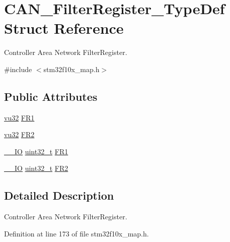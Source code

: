\hypertarget{struct_c_a_n___filter_register___type_def}{}\section{C\+A\+N\+\_\+\+Filter\+Register\+\_\+\+Type\+Def Struct Reference}
\label{struct_c_a_n___filter_register___type_def}


Controller Area Network Filter\+Register.  




{\ttfamily \#include $<$stm32f10x\+\_\+map.\+h$>$}

\subsection*{Public Attributes}
\begin{DoxyCompactItemize}
\item 
\hyperlink{agilefox_2library_2inc_2stm32f10x__type_8h_a6e2761f0a1011f84ed96b946f2c8a563}{vu32} \hyperlink{struct_c_a_n___filter_register___type_def_a3d54787d8329760446586ad21da29667}{F\+R1}
\item 
\hyperlink{agilefox_2library_2inc_2stm32f10x__type_8h_a6e2761f0a1011f84ed96b946f2c8a563}{vu32} \hyperlink{struct_c_a_n___filter_register___type_def_a028ebea46be9809d8e350efcb4a686bc}{F\+R2}
\item 
\hyperlink{group___c_m_s_i_s___c_m3__core__definitions_gaec43007d9998a0a0e01faede4133d6be}{\+\_\+\+\_\+\+IO} \hyperlink{_p_e___types_8h_a33594304e786b158f3fb30289278f5af}{uint32\+\_\+t} \hyperlink{struct_c_a_n___filter_register___type_def_ac9bc1e42212239d6830582bf0c696fc5}{F\+R1}
\item 
\hyperlink{group___c_m_s_i_s___c_m3__core__definitions_gaec43007d9998a0a0e01faede4133d6be}{\+\_\+\+\_\+\+IO} \hyperlink{_p_e___types_8h_a33594304e786b158f3fb30289278f5af}{uint32\+\_\+t} \hyperlink{struct_c_a_n___filter_register___type_def_a77959e28a302b05829f6a1463be7f800}{F\+R2}
\end{DoxyCompactItemize}


\subsection{Detailed Description}
Controller Area Network Filter\+Register. 

Definition at line 173 of file stm32f10x\+\_\+map.\+h.



